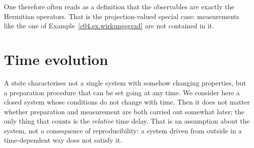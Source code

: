 One therefore often reads as a definition that the observables are exactly the Hermitian
operators. That is the projection-valued special case: measurements like the one of
Example~\ref{c04.ex.wirkungsgrad} are not contained in it.

\section{Time evolution}\label{c04.s2}

A state characterises not a single system with somehow changing properties, but a preparation
procedure that can be set going at any time. We consider here a closed system whose conditions do
not change with time. Then it does not matter whether preparation and measurement are both carried
out somewhat later; the only thing that counts is the \emph{relative} time delay. That is an
assumption about the system, not a consequence of reproducibility: a system driven from outside in
a time-dependent way does not satisfy it.

